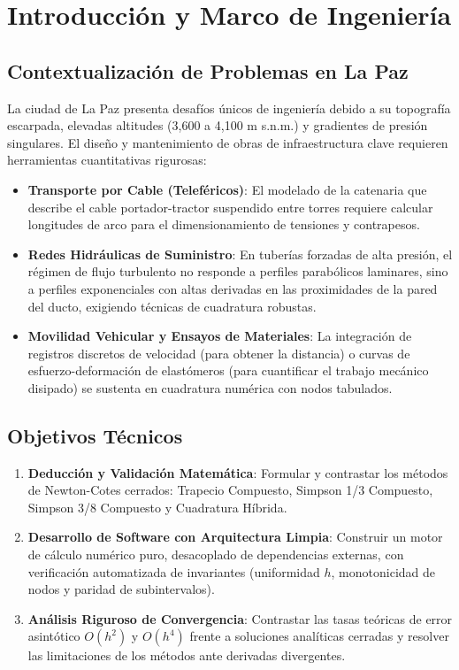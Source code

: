 \documentclass[11pt,a4paper]{article}
\begin{document}
\newpage
\tableofcontents
\newpage

\section{Introducción y Marco de Ingeniería}

\subsection{Contextualización de Problemas en La Paz}
La ciudad de La Paz presenta desafíos únicos de ingeniería debido a su topografía escarpada, elevadas altitudes (3,600 a 4,100 m s.n.m.) y gradientes de presión singulares. El diseño y mantenimiento de obras de infraestructura clave requieren herramientas cuantitativas rigurosas:
\begin{itemize}
    \item \textbf{Transporte por Cable (Teleféricos)}: El modelado de la catenaria que describe el cable portador-tractor suspendido entre torres requiere calcular longitudes de arco para el dimensionamiento de tensiones y contrapesos.
    \item \textbf{Redes Hidráulicas de Suministro}: En tuberías forzadas de alta presión, el régimen de flujo turbulento no responde a perfiles parabólicos laminares, sino a perfiles exponenciales con altas derivadas en las proximidades de la pared del ducto, exigiendo técnicas de cuadratura robustas.
    \item \textbf{Movilidad Vehicular y Ensayos de Materiales}: La integración de registros discretos de velocidad (para obtener la distancia) o curvas de esfuerzo-deformación de elastómeros (para cuantificar el trabajo mecánico disipado) se sustenta en cuadratura numérica con nodos tabulados.
\end{itemize}

\subsection{Objetivos Técnicos}
\begin{enumerate}
    \item \textbf{Deducción y Validación Matemática}: Formular y contrastar los métodos de Newton-Cotes cerrados: Trapecio Compuesto, Simpson 1/3 Compuesto, Simpson 3/8 Compuesto y Cuadratura Híbrida.
    \item \textbf{Desarrollo de Software con Arquitectura Limpia}: Construir un motor de cálculo numérico puro, desacoplado de dependencias externas, con verificación automatizada de invariantes (uniformidad $h$, monotonicidad de nodos y paridad de subintervalos).
    \item \textbf{Análisis Riguroso de Convergencia}: Contrastar las tasas teóricas de error asintótico $O(h^2)$ y $O(h^4)$ frente a soluciones analíticas cerradas y resolver las limitaciones de los métodos ante derivadas divergentes.
\end{enumerate}
\end{document}
